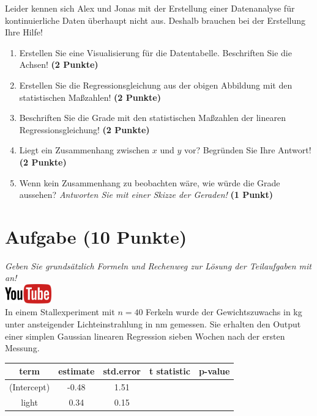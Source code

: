 \documentclass[a4paper, 9pt]{scrartcl}\usepackage[]{graphicx}\usepackage[]{xcolor}
\begin{document}
Leider kennen sich Alex und Jonas mit der Erstellung einer Datenanalyse für kontinuierliche Daten überhaupt nicht aus. Deshalb brauchen bei der Erstellung Ihre Hilfe!

\begin{enumerate}
\item Erstellen  Sie  eine  Visualisierung  für  die  Datentabelle.  Beschriften  Sie  die  Achsen! \textbf{(2 Punkte)}
\item Erstellen Sie die Regressionsgleichung aus der obigen Abbildung mit den statistischen Maßzahlen! \textbf{(2 Punkte)}
\item Beschriften Sie die Grade mit den statistischen Maßzahlen der linearen Regressionsgleichung! \textbf{(2 Punkte)}
\item Liegt ein Zusammenhang zwischen $x$ und $y$ vor? Begründen Sie Ihre Antwort! \textbf{(2 Punkte)}
\item Wenn kein Zusammenhang zu beobachten wäre, wie würde die Grade aussehen? \textit{Antworten Sie mit einer Skizze der Geraden!} \textbf{(1 Punkt)}
\end{enumerate} 
\clearpage

\section{Aufgabe \hfill (10 Punkte)}

\textit{Geben Sie grunds{\"a}tzlich Formeln und Rechenweg zur L{\"o}sung der
  Teilaufgaben mit an!} \\[1Ex]

\hfill\href{https://youtu.be/lJp8rFmMnrs}{\includegraphics[width =
  2cm]{img/youtube}}\\[1Ex]



In einem Stallexperiment mit $n = 40$ Ferkeln wurde der
Gewichtszuwachs in kg unter ansteigender Lichteinstrahlung in nm
gemessen. Sie erhalten den \Rlogo Output einer simplen Gaussian linearen
Regression sieben Wochen nach der ersten Messung.

\begin{table}[!h]
\centering\begingroup\fontsize{14}{16}\selectfont

\begin{tabular}{ccccc}
\toprule
term & estimate & std.error & t statistic & p-value\\
\midrule
(Intercept) & -0.48 & 1.51 &  & \\
light & 0.34 & 0.15 &  & \\
\bottomrule
\end{tabular}
\endgroup{}
\end{table}
\end{document}
